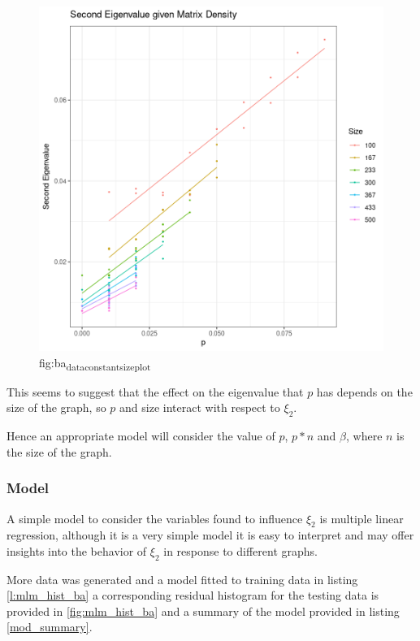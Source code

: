 \documentclass[11pt]{report}
\begin{document}
\begin{figure}[htbp]
\centering
\includegraphics[width=12cm]{media/ba_constant_size_plot.png}
\caption{\label{fig:ba_data_constant_size_plot}fig:ba\textsubscript{data}\textsubscript{constant}\textsubscript{size}\textsubscript{plot}}
\end{figure}


This seems to suggest that the effect on the eigenvalue that \(p\) has depends on the size of the graph, so  \(p\) and size interact with respect to \(\xi_{2}\).

Hence an appropriate model will consider the value of \(p\), \(p*n\) and \(\beta\), where \(n\) is the size of the graph.

\subsubsection{Model}
\label{sec:org767df9c}
A simple model to consider the variables found to influence \(\xi_{2}\) is
multiple linear regression, although it is a very simple model it is easy to
interpret and may offer insights into the behavior of \(\xi_{2}\) in response
to different graphs.

More data was generated and a model fitted to training data in listing
\ref{l:mlm_hist_ba} a corresponding residual histogram for the testing data is provided in \ref{fig:mlm_hist_ba} and a summary of the model provided in listing \ref{mod_summary}.
\end{document}
